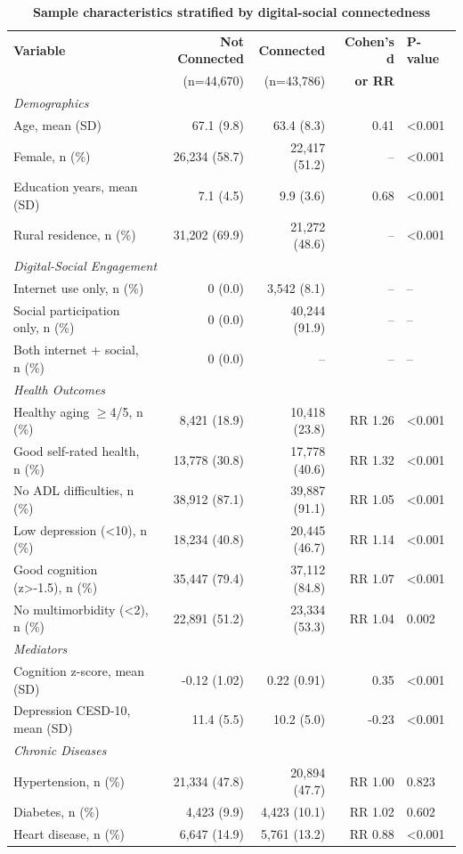 \documentclass[10pt]{article}
\begin{document}
\begin{table}[h]
\centering
\caption{\textbf{Sample characteristics stratified by digital-social connectedness}}
\small
\begin{tabular}{lrrrl}
\toprule
\textbf{Variable} & \textbf{Not Connected} & \textbf{Connected} & \textbf{Cohen's d} & \textbf{P-value} \\
& (n=44,670) & (n=43,786) & \textbf{or RR} & \\
\midrule
\multicolumn{5}{l}{\textit{Demographics}} \\
Age, mean (SD) & 67.1 (9.8) & 63.4 (8.3) & 0.41 & <0.001 \\
Female, n (\%) & 26,234 (58.7) & 22,417 (51.2) & -- & <0.001 \\
Education years, mean (SD) & 7.1 (4.5) & 9.9 (3.6) & 0.68 & <0.001 \\
Rural residence, n (\%) & 31,202 (69.9) & 21,272 (48.6) & -- & <0.001 \\
\midrule
\multicolumn{5}{l}{\textit{Digital-Social Engagement}} \\
Internet use only, n (\%) & 0 (0.0) & 3,542 (8.1) & -- & -- \\
Social participation only, n (\%) & 0 (0.0) & 40,244 (91.9) & -- & -- \\
Both internet + social, n (\%) & 0 (0.0) & -- & -- & -- \\
\midrule
\multicolumn{5}{l}{\textit{Health Outcomes}} \\
Healthy aging $\geq$4/5, n (\%) & 8,421 (18.9) & 10,418 (23.8) & RR 1.26 & <0.001 \\
Good self-rated health, n (\%) & 13,778 (30.8) & 17,778 (40.6) & RR 1.32 & <0.001 \\
No ADL difficulties, n (\%) & 38,912 (87.1) & 39,887 (91.1) & RR 1.05 & <0.001 \\
Low depression (<10), n (\%) & 18,234 (40.8) & 20,445 (46.7) & RR 1.14 & <0.001 \\
Good cognition (z>-1.5), n (\%) & 35,447 (79.4) & 37,112 (84.8) & RR 1.07 & <0.001 \\
No multimorbidity (<2), n (\%) & 22,891 (51.2) & 23,334 (53.3) & RR 1.04 & 0.002 \\
\midrule
\multicolumn{5}{l}{\textit{Mediators}} \\
Cognition z-score, mean (SD) & -0.12 (1.02) & 0.22 (0.91) & 0.35 & <0.001 \\
Depression CESD-10, mean (SD) & 11.4 (5.5) & 10.2 (5.0) & -0.23 & <0.001 \\
\midrule
\multicolumn{5}{l}{\textit{Chronic Diseases}} \\
Hypertension, n (\%) & 21,334 (47.8) & 20,894 (47.7) & RR 1.00 & 0.823 \\
Diabetes, n (\%) & 4,423 (9.9) & 4,423 (10.1) & RR 1.02 & 0.602 \\
Heart disease, n (\%) & 6,647 (14.9) & 5,761 (13.2) & RR 0.88 & <0.001 \\
\bottomrule
\end{tabular}
\end{table}
\end{document}
